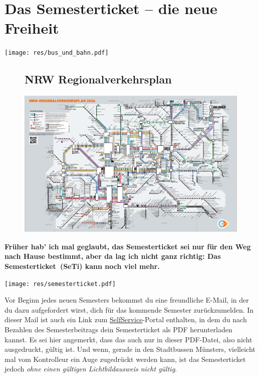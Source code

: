 \section{Das Semesterticket -- die neue Freiheit}

\begin{center}
	\texttt{[image: res/bus\_und\_bahn.pdf]}
\end{center}
\begin{multicols*}{2}
\begin{figure}[t]
	\subsection{NRW Regionalverkehrsplan}
	\includegraphics[width=\textwidth]{res/NRW_Verkehrsplan_2024.PNG}
\end{figure}
\textbf{Früher hab' ich mal geglaubt, das Semesterticket sei nur für den Weg nach Hause bestimmt, aber da lag ich nicht ganz richtig: Das Semesterticket~(SeTi) kann noch viel mehr.}

\texttt{[image: res/semesterticket.pdf]}

Vor Beginn jedes neuen Semesters bekommst du eine freundliche E-Mail, in der du dazu aufgefordert wirst, dich für das kommende Semester zurückzumelden. In dieser Mail ist auch ein Link zum \href{https://zividp.uni-muenster.de/idp/profile/SAML2/POST/SSO?execution=e1s1}{SelfService}-Portal enthalten, in dem du nach Bezahlen des Semesterbeitrags dein Semesterticket als PDF herunterladen kannst. Es sei hier angemerkt, dass das auch nur in dieser PDF-Datei, also nicht ausgedruckt, gültig ist.
Und wenn, gerade in den Stadtbussen Münsters, vielleicht mal vom Kontrolleur ein Auge zugedrückt werden kann, ist das Semesterticket jedoch \textit{ohne einen gültigen Lichtbildausweis nicht gültig}.


\end{multicols*}
